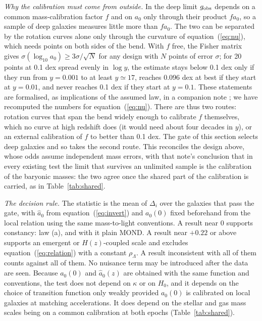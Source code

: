 \documentclass[fleqn,usenatbib]{mnras}
\begin{document}
\emph{Why the calibration must come from outside.} In the deep limit $g_{\rm obs}$ depends on a common mass-calibration factor $f$ and on $a_0$ only through their product $fa_0$, so a sample of deep galaxies measures little more than $fa_0$. The two can be separated by the rotation curves alone only through the curvature of equation~(\ref{eq:nu}), which needs points on both sides of the bend. With $f$ free, the Fisher matrix gives $\sigma(\log_{10}a_0)\geq3\sigma/\sqrt N$ for any design with $N$ points of error $\sigma$; for 20 points at 0.1 dex spread evenly in $\log y$, the estimate stays below 0.1 dex only if they run from $y=0.001$ to at least $y\simeq17$, reaches 0.096 dex at best if they start at $y=0.01$, and never reaches 0.1 dex if they start at $y=0.1$. These statements are formalised, as implications of the assumed law, in a companion note \citep{Zimmerman2026wall}; we have recomputed the numbers for equation~(\ref{eq:nu}). There are thus two routes: rotation curves that span the bend widely enough to calibrate $f$ themselves, which no curve at high redshift does (it would need about four decades in $y$), or an external calibration of $f$ to better than 0.1 dex. The gate of this section selects deep galaxies and so takes the second route. This reconciles the design above, whose odds assume independent mass errors, with that note's conclusion that in every existing test the limit that survives an unlimited sample is the calibration of the baryonic masses: the two agree once the shared part of the calibration is carried, as in Table~\ref{tab:shared}.

\emph{The decision rule.} The statistic is the mean of $\Delta_i$ over the galaxies that pass the gate, with $\hat a_0$ from equation~(\ref{eq:invert}) and $a_0(0)$ fixed beforehand from the local relation using the same mass-to-light conventions. A result near $0$ supports constancy: law (a), and with it plain MOND. A result near $+0.22$ or above supports an emergent or $H(z)$-coupled scale and excludes equation~(\ref{eq:relation}) with a constant $\rho_\Lambda$. A result inconsistent with all of them counts against all of them. No nuisance term may be introduced after the data are seen. Because $a_0(0)$ and $\hat a_0(z)$ are obtained with the same function and conventions, the test does not depend on $\kappa$ or on $H_0$, and it depends on the choice of transition function only weakly provided $a_0(0)$ is calibrated on local galaxies at matching accelerations. It does depend on the stellar and gas mass scales being on a common calibration at both epochs (Table~\ref{tab:shared}).
\end{document}
